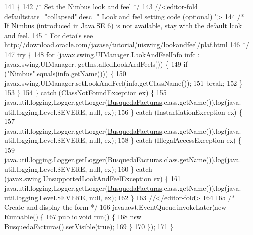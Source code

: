 \begin{DoxyCode}
141                                            \{
142         \textcolor{comment}{/* Set the Nimbus look and feel */}
143         \textcolor{comment}{//<editor-fold defaultstate="collapsed" desc=" Look and feel setting code (optional) ">}
144         \textcolor{comment}{/* If Nimbus (introduced in Java SE 6) is not available, stay with the default look and feel.}
145 \textcolor{comment}{         * For details see http://download.oracle.com/javase/tutorial/uiswing/lookandfeel/plaf.html }
146 \textcolor{comment}{         */}
147         \textcolor{keywordflow}{try} \{
148             \textcolor{keywordflow}{for} (javax.swing.UIManager.LookAndFeelInfo info : javax.swing.UIManager.
      getInstalledLookAndFeels()) \{
149                 \textcolor{keywordflow}{if} (\textcolor{stringliteral}{"Nimbus"}.equals(info.getName())) \{
150                     javax.swing.UIManager.setLookAndFeel(info.getClassName());
151                     \textcolor{keywordflow}{break};
152                 \}
153             \}
154         \} \textcolor{keywordflow}{catch} (ClassNotFoundException ex) \{
155             java.util.logging.Logger.getLogger(\mbox{\hyperlink{class_interfaz_package_1_1_busqueda_facturas_ab8143adc0ff8d4b0bd5d726a3930e0f7}{BusquedaFacturas}}.class.getName()).log(java.
      util.logging.Level.SEVERE, null, ex);
156         \} \textcolor{keywordflow}{catch} (InstantiationException ex) \{
157             java.util.logging.Logger.getLogger(\mbox{\hyperlink{class_interfaz_package_1_1_busqueda_facturas_ab8143adc0ff8d4b0bd5d726a3930e0f7}{BusquedaFacturas}}.class.getName()).log(java.
      util.logging.Level.SEVERE, null, ex);
158         \} \textcolor{keywordflow}{catch} (IllegalAccessException ex) \{
159             java.util.logging.Logger.getLogger(\mbox{\hyperlink{class_interfaz_package_1_1_busqueda_facturas_ab8143adc0ff8d4b0bd5d726a3930e0f7}{BusquedaFacturas}}.class.getName()).log(java.
      util.logging.Level.SEVERE, null, ex);
160         \} \textcolor{keywordflow}{catch} (javax.swing.UnsupportedLookAndFeelException ex) \{
161             java.util.logging.Logger.getLogger(\mbox{\hyperlink{class_interfaz_package_1_1_busqueda_facturas_ab8143adc0ff8d4b0bd5d726a3930e0f7}{BusquedaFacturas}}.class.getName()).log(java.
      util.logging.Level.SEVERE, null, ex);
162         \}
163         \textcolor{comment}{//</editor-fold>}
164 
165         \textcolor{comment}{/* Create and display the form */}
166         java.awt.EventQueue.invokeLater(\textcolor{keyword}{new} Runnable() \{
167             \textcolor{keyword}{public} \textcolor{keywordtype}{void} run() \{
168                 \textcolor{keyword}{new} \mbox{\hyperlink{class_interfaz_package_1_1_busqueda_facturas_ab8143adc0ff8d4b0bd5d726a3930e0f7}{BusquedaFacturas}}().setVisible(\textcolor{keyword}{true});
169             \}
170         \});
171     \}
\end{DoxyCode}


